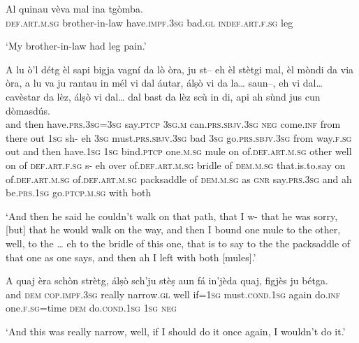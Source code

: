 \begin{linenumbers}
\gll   Al quinau vèva mal ina tgòmba. \\
 \textsc{def.art.m.sg} brother-in-law have.\textsc{impf.3sg} bad.\textsc{gl} \textsc{indef.art.f.sg} leg \\
\end{linenumbers}
\medskip
\glt `My brother-in-law had leg pain.'
\medskip

\begin{linenumbers}
\gll  A lu ò’l détg èl sapi bigja vagní da lò òra, ju st– eh èl stètgi mal, èl mòndi da via òra, a lu va ju rantau in mél vi dal áutar,  álṣò vi da la… saun–, eh vi dal… cavèstar da lèz, álṣò vi dal… dal bast da lèz scù in di, api ah sùnd jus cun dòmasdús.  \\
and then have.\textsc{prs.3sg=3sg} say.\textsc{ptcp} \textsc{3sg.m} can.\textsc{prs.sbjv.3sg} \textsc{neg}  come.\textsc{inf} from there out \textsc{1sg} sh- eh \textsc{3sg} must.\textsc{prs.sbjv.3sg} bad \textsc{3sg} go.\textsc{prs.sbjv.3sg} from way.\textsc{f.sg} out and then have.\textsc{1sg} \textsc{1sg} bind.\textsc{ptcp} one.\textsc{m.sg} mule on of.\textsc{def.art.m.sg} other well on of \textsc{def.art.f.sg} s- eh over of.\textsc{def.art.m.sg} bridle  of \textsc{dem.m.sg} that.is.to.say on of.\textsc{def.art.m.sg} of.\textsc{def.art.m.sg} packsaddle of \textsc{dem.m.sg} as \textsc{gnr}  say.\textsc{prs.3sg} and ah be.\textsc{prs.1sg} go.\textsc{ptcp.m.sg} with both \\
\end{linenumbers}
\medskip
\glt `And then he said he couldn’t walk on that path, that I w- that he was sorry, [but] that he would walk on the way, and then I bound one mule to the other, well, to the … eh to the bridle of this one, that is to say to the the packsaddle of that one as one says, and then ah I left with both [mules].'
\medskip

\begin{linenumbers}
\gll  A quaj èra schòn strètg, álṣò sch’ju stèṣ aun fá in’jèda quaj, figjès ju bétga.  \\
 and \textsc{dem} \textsc{cop.impf.3sg} really narrow.\textsc{gl} well if=\textsc{1sg}  must.\textsc{cond.1sg} again do.\textsc{inf} one.\textsc{f.sg=}time  \textsc{dem} do.\textsc{cond.1sg} \textsc{1sg} \textsc{neg} \\
\end{linenumbers}
\medskip
\glt `And this was really narrow, well, if I should do it once again, I wouldn’t do it.'
\medskip

